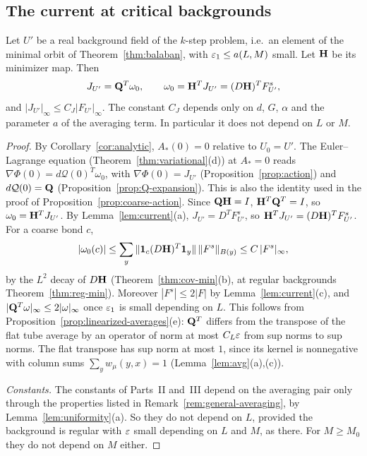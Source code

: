 \subsection{The current at critical backgrounds}

\begin{lemma}\label{lem:critical-current}
Let $U'$ be a real background field of the $k$-step problem, i.e.\ an element of the minimal orbit of Theorem~\ref{thm:balaban}, with $\varepsilon_1\le a(L,M)$ small. Let $\mathbf H$ be its minimizer map. Then
\[
J_{U'}=\mathbf Q^T\omega_0,\qquad\omega_0=\mathbf H^TJ_{U'}=(D\mathbf H)^TF^s_{U'},
\]
and $|J_{U'}|_\infty\le C_J|F_{U'}|_\infty$. The constant $C_J$ depends only on $d$, $G$, $\alpha$ and the parameter $a$ of the averaging term. In particular it does not depend on $L$ or $M$.
\end{lemma}

\begin{proof}
By Corollary~\ref{cor:analytic}, $A_*(0)=0$ relative to $U_0=U'$. The Euler--Lagrange equation (Theorem~\ref{thm:variational}(d)) at $A_*=0$ reads $\nabla\Phi(0)=d\mathcal Q(0)^T\omega_0$, with $\nabla\Phi(0)=J_{U'}$ (Proposition~\ref{prop:action}) and $d\mathcal Q(0)=\mathbf Q$ (Proposition~\ref{prop:Q-expansion}). This is also the identity used in the proof of Proposition~\ref{prop:coarse-action}. Since $\mathbf Q\mathbf H=I$, $\mathbf H^T\mathbf Q^T=I$, so $\omega_0=\mathbf H^TJ_{U'}$. By Lemma~\ref{lem:current}(a), $J_{U'}=D^TF^s_{U'}$, so $\mathbf H^TJ_{U'}=(D\mathbf H)^TF^s_{U'}$. For a coarse bond $c$,
\[
|\omega_0(c)|\le\sum_{y}\|\mathbf 1_c(D\mathbf H)^T\mathbf 1_y\|\,\|F^s\|_{B(y)}\le C\,|F^s|_\infty ,
\]
by the $L^2$ decay of $D\mathbf H$ (Theorem~\ref{thm:cov-min}(b), at regular backgrounds Theorem~\ref{thm:reg-min}). Moreover $|F^s|\le2|F|$ by Lemma~\ref{lem:current}(c), and $|\mathbf Q^T\omega|_\infty\le2|\omega|_\infty$ once $\varepsilon_1$ is small depending on $L$. This follows from Proposition~\ref{prop:linearized-averages}(e): $\mathbf Q^T$ differs from the transpose of the flat tube average by an operator of norm at most $C_L\varepsilon$ from sup norms to sup norms. The flat transpose has sup norm at most $1$, since its kernel is nonnegative with column sums $\sum_yw_\mu(y,x)=1$ (Lemma~\ref{lem:avg}(a),(c)).

\emph{Constants.} The constants of Parts~II and~III depend on the averaging pair only through the properties listed in Remark~\ref{rem:general-averaging}, by Lemma~\ref{lem:uniformity}(a). So they do not depend on $L$, provided the background is regular with $\varepsilon$ small depending on $L$ and $M$, as there. For $M\ge M_0$ they do not depend on $M$ either.
\end{proof}

